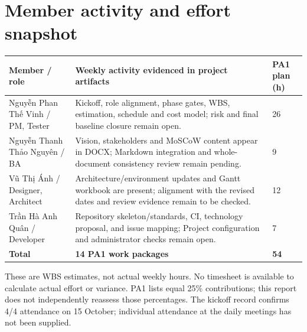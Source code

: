 \documentclass[11pt,a4paper]{article}
\begin{document}
\section{Member activity and effort snapshot}
{\small
\begin{tabularx}{\textwidth}{@{}P{46mm}YP{22mm}@{}}
\toprule
{}\textbf{Member / role} & \textbf{Weekly activity evidenced in project artifacts} & \textbf{PA1 plan (h)} \\
\midrule
Nguyễn Phan Thế Vinh / PM, Tester & Kickoff, role alignment, phase gates, WBS, estimation, schedule and cost model; risk and final baseline closure remain open. & 26 \\
Nguyễn Thanh Thảo Nguyên / BA & Vision, stakeholders and MoSCoW content appear in DOCX; Markdown integration and whole-document consistency review remain pending. & 9 \\
Vũ Thị Ánh / Designer, Architect & Architecture/environment updates and Gantt workbook are present; alignment with the revised dates and review evidence remain to be checked. & 12 \\
Trần Hà Anh Quân / Developer & Repository skeleton/standards, CI, technology proposal, and issue mapping; Project configuration and administrator checks remain open. & 7 \\
\midrule
\textbf{Total} & \textbf{14 PA1 work packages} & \textbf{54} \\
\bottomrule
\end{tabularx}}

These are WBS estimates, not actual weekly hours. No timesheet is available to calculate actual effort or variance. PA1 lists equal 25\% contributions; this report does not independently reassess those percentages. The kickoff record confirms 4/4 attendance on 15 October; individual attendance at the daily meetings has not been supplied.
\end{document}

